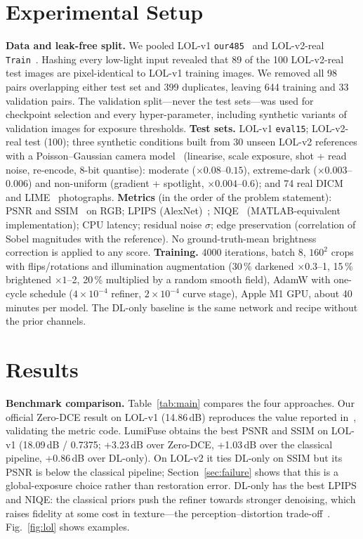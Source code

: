 \documentclass[conference]{IEEEtran}
\begin{document}
\section{Experimental Setup}
\textbf{Data and leak-free split.} We pooled LOL-v1 \texttt{our485}~\cite{wei2018retinexnet} and LOL-v2-real
\texttt{Train}~\cite{yang2021lolv2}. Hashing every low-light input revealed that 89 of the 100 LOL-v2-real test
images are pixel-identical to LOL-v1 training images. We removed all 98 pairs overlapping either test set and 399
duplicates, leaving 644 training and 33 validation pairs. The validation split---never the test sets---was used for
checkpoint selection and every hyper-parameter, including synthetic variants of validation images for exposure
thresholds. \textbf{Test sets.} LOL-v1 \texttt{eval15}; LOL-v2-real test (100); three synthetic conditions built from
30 unseen LOL-v2 references with a Poisson--Gaussian camera model~\cite{foi2008noise} (linearise, scale exposure,
shot + read noise, re-encode, 8-bit quantise): moderate ($\times0.08$--$0.15$), extreme-dark
($\times0.003$--$0.006$) and non-uniform (gradient + spotlight, $\times0.004$--$0.6$); and 74 real DICM~\cite{lee2013dicm}
and LIME~\cite{guo2017lime} photographs. \textbf{Metrics} (in the order of the problem statement): PSNR and
SSIM~\cite{wang2004ssim} on RGB; LPIPS (AlexNet)~\cite{zhang2018lpips}; NIQE~\cite{mittal2013niqe} (MATLAB-equivalent
implementation); CPU latency; residual noise $\sigma$; edge preservation (correlation of Sobel magnitudes with the
reference). No ground-truth-mean brightness correction is applied to any score. \textbf{Training.} 4000 iterations,
batch 8, $160^2$ crops with flips/rotations and illumination augmentation (30\,\% darkened $\times0.3$--1, 15\,\%
brightened $\times1$--2, 20\,\% multiplied by a random smooth field), AdamW with one-cycle schedule ($4\times10^{-4}$
refiner, $2\times10^{-4}$ curve stage), Apple M1 GPU, about 40 minutes per model. The DL-only baseline is the
same network and recipe without the prior channels.

\section{Results}


\textbf{Benchmark comparison.} Table~\ref{tab:main} compares the four approaches. Our official Zero-DCE result on
LOL-v1 (14.86\,dB) reproduces the value reported in~\cite{guo2020zerodce}, validating the metric code. LumiFuse
obtains the best PSNR and SSIM on LOL-v1 (18.09\,dB / 0.7375; +3.23\,dB over Zero-DCE, +1.03\,dB over the classical
pipeline, +0.86\,dB over DL-only). On LOL-v2 it ties DL-only on SSIM but its PSNR is below the classical pipeline;
Section~\ref{sec:failure} shows that this is a global-exposure choice rather than restoration error. DL-only has the
best LPIPS and NIQE: the classical priors push the refiner towards stronger denoising, which raises fidelity at some
cost in texture---the perception--distortion trade-off~\cite{blau2018perception}. Fig.~\ref{fig:lol} shows examples.
\end{document}
